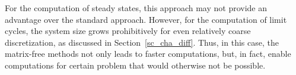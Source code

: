 For the computation of steady states, this approach may not provide an advantage over the standard approach. However, for the computation of limit cycles, the system size grows prohibitively for even relatively coarse discretization, as discussed in Section~\ref{sc_cha_diff}. Thus, in this case, the matrix-free methods not only leads to faster computations, but, in fact, enable computations for certain problem that would otherwise not be possible.  %


